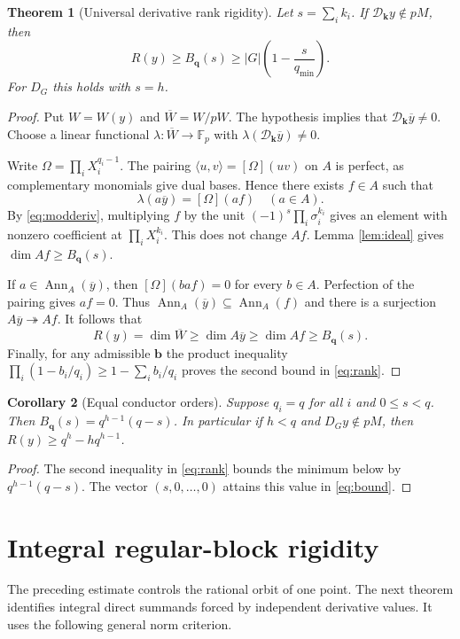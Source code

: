 \documentclass[11pt,a4paper]{article}
\newtheorem{theorem}{Theorem}[section]
\newtheorem{corollary}[theorem]{Corollary}
\theoremstyle{definition}
\theoremstyle{remark}
\newcommand{\Fp}{\mathbb F_p}
\newcommand{\Ann}{\operatorname{Ann}}
\newcommand{\D}{\mathcal D}
\begin{document}
\begin{theorem}[Universal derivative rank rigidity]\label{thm:rank}
Let $s=\sum_i k_i$. If $\D_{\mathbf k}y\notin pM$, then
\begin{equation}\label{eq:rank}
 R(y)\ge B_{\mathbf q}(s)\ge |G|\left(1-\frac{s}{q_{\min}}\right).
\end{equation}
For $D_G$ this holds with $s=h$.
\end{theorem}
\begin{proof}
Put $W=W(y)$ and $\overline W=W/pW$. The hypothesis implies that $\D_{\mathbf k}\overline y\ne0$. Choose a linear functional $\lambda:\overline W\to\Fp$ with $\lambda(\D_{\mathbf k}\overline y)\ne0$.

Write $\Omega=\prod_iX_i^{q_i-1}$. The pairing $\langle u,v\rangle=[\Omega](uv)$ on $A$ is perfect, as complementary monomials give dual bases. Hence there exists $f\in A$ such that
\[
 \lambda(a\overline y)=[\Omega](af)\quad(a\in A).
\]
By \eqref{eq:modderiv}, multiplying $f$ by the unit $(-1)^s\prod_i\sigma_i^{k_i}$ gives an element with nonzero coefficient at $\prod_iX_i^{k_i}$. This does not change $Af$. Lemma \ref{lem:ideal} gives $\dim Af\ge B_{\mathbf q}(s)$.

If $a\in\Ann_A(\overline y)$, then $[\Omega](baf)=0$ for every $b\in A$. Perfection of the pairing gives $af=0$. Thus $\Ann_A(\overline y)\subseteq\Ann_A(f)$ and there is a surjection $A\overline y\twoheadrightarrow Af$. It follows that
\[
 R(y)=\dim\overline W\ge\dim A\overline y\ge\dim Af\ge B_{\mathbf q}(s).
\]
Finally, for any admissible $\mathbf b$ the product inequality $\prod_i(1-b_i/q_i)\ge1-\sum_i b_i/q_i$ proves the second bound in \eqref{eq:rank}.
\end{proof}

\begin{corollary}[Equal conductor orders]\label{cor:equal}
Suppose $q_i=q$ for all $i$ and $0\le s<q$. Then $B_{\mathbf q}(s)=q^{h-1}(q-s)$. In particular if $h<q$ and $D_Gy\notin pM$, then $R(y)\ge q^h-hq^{h-1}$.
\end{corollary}
\begin{proof}
The second inequality in \eqref{eq:rank} bounds the minimum below by $q^{h-1}(q-s)$. The vector $(s,0,\ldots,0)$ attains this value in \eqref{eq:bound}.
\end{proof}

\section{Integral regular-block rigidity}
The preceding estimate controls the rational orbit of one point. The next theorem identifies integral direct summands forced by independent derivative values. It uses the following general norm criterion.
\end{document}
